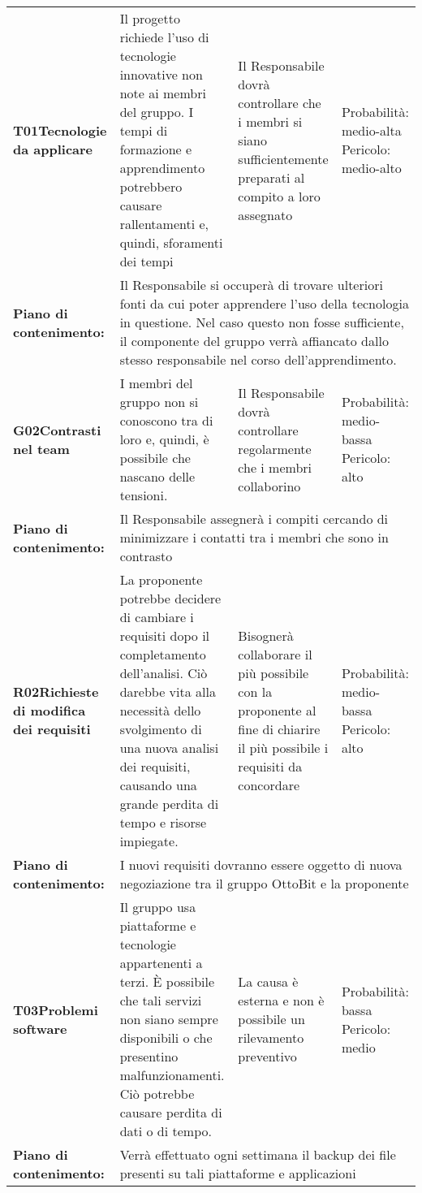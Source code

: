 \begin{longtable}{>{\bfseries}p{2.5cm} p{4.5cm} p{4.5cm} p{2.5cm}}
		\hline
		T01\newline Tecnologie da applicare
		& Il progetto richiede l'uso di tecnologie innovative non note ai membri del gruppo. I tempi di formazione e apprendimento potrebbero causare rallentamenti e, quindi, sforamenti dei tempi 
		& Il Responsabile dovrà controllare che i membri si siano sufficientemente preparati al compito a loro assegnato 
		& Probabilità: medio-alta \newline Pericolo: medio-alto \\
		\rowcolor{LightGray}
		Piano di contenimento: 
		& \multicolumn{3}{p{12.5cm}}{Il Responsabile si occuperà di trovare ulteriori fonti da cui poter apprendere l'uso della tecnologia in questione. Nel caso questo non fosse sufficiente, il componente del gruppo verrà affiancato dallo stesso responsabile nel corso dell'apprendimento.}\\[0.5cm]

		\hline
		G02\newline Contrasti nel team
		& I membri del gruppo non si conoscono tra di loro e, quindi, è possibile che nascano delle tensioni. 
		&  Il Responsabile dovrà controllare regolarmente che i membri collaborino
		& Probabilità: medio-bassa \newline Pericolo: alto \\
		\rowcolor{LightGray}
		Piano di contenimento: 
		& \multicolumn{3}{p{12.5cm}}{Il Responsabile assegnerà i compiti cercando di minimizzare i contatti tra i membri che sono in contrasto}\\[0.5cm]

		\hline
		R02\newline Richieste di modifica dei requisiti
		& La proponente potrebbe decidere di cambiare i requisiti dopo il completamento dell'analisi. Ciò darebbe vita alla necessità dello svolgimento di una nuova analisi dei requisiti, causando una grande perdita di tempo e risorse impiegate.
		& Bisognerà collaborare il più possibile con la proponente al fine di chiarire il più possibile i requisiti da concordare
		& Probabilità: medio-bassa \newline Pericolo: alto \\
		\rowcolor{LightGray}
		Piano di contenimento:
		& \multicolumn{3}{p{12.5cm}}{I nuovi requisiti dovranno essere oggetto di nuova negoziazione tra il gruppo OttoBit e la proponente}\\[0.5cm]

		\hline
		T03\newline Problemi software
		& Il gruppo usa piattaforme e tecnologie appartenenti a terzi. \`E possibile che tali servizi non siano sempre disponibili o che presentino malfunzionamenti. Ciò potrebbe causare perdita di dati o di tempo.
		& La causa è esterna e non è possibile un rilevamento preventivo
		& Probabilità: bassa \newline Pericolo: medio \\
		\rowcolor{LightGray}
		Piano di contenimento: 
		& \multicolumn{3}{p{12.5cm}}{Verrà effettuato ogni settimana il backup dei file presenti su tali piattaforme e applicazioni}\\[0.5cm]


\end{longtable}
